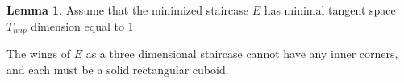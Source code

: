 \documentclass{amsart}[10pt]
\theoremstyle{plain}
\theoremstyle{definition}
\newtheorem{lemma}[theorem]{Lemma}
\begin{document}

\begin{lemma}
\label{cuboid}
Assume that the minimized staircase $E$ has minimal tangent space  $T_{nnp}$ dimension equal to $1$. 

The wings of $E$ as a three dimensional staircase cannot have any inner corners, and each must be a solid rectangular cuboid.   
\end{lemma}
\end{document}
